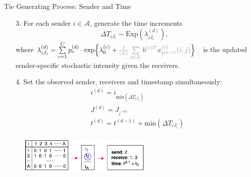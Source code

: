 \documentclass[10pt]{beamer}
\theoremstyle{definition}
\theoremstyle{remark}
\begin{document}
\begin{frame}{Tie Generating Process: Sender and Time}
\begin{itemize}
		\item [3.] For each sender $i \in \mathcal{A}$, generate the time increments 
		\footnotesize	\begin{equation*}
		\Delta T_{i{J_i}} \sim \mbox{Exp}(\lambda_{i{J_i}}^{(d)}),
		\end{equation*}\normalsize
		where \footnotesize$\lambda^{(d)}_{iJ_i}= \sum\limits_{c=1}^{C} p^{(d)}_c\cdot\mbox{exp}\Big\{\lambda^{(c)}_0+\textcolor{gray}{\frac{1}{|J_i|}\sum\limits_{j \in J_i} \boldsymbol{b}^{(c)T}\boldsymbol{x}^{(c)}_{t^{(d-1)}}(i, j)}\Big\}\quad$\normalsize is the updated sender-specific stochastic intensity given the receivers.\vspace{0.4cm}
		\item[4.] Set the observed sender, receivers and timestamp simultaneously:
		\footnotesize	\begin{equation*}
		\begin{aligned}
		&i^{(d)} = i_{\mbox{min}(\Delta T_{i{J_i}})} \\
		&J^{(d)} = J_{i^{(d)}}\\
		&t^{(d)} = t^{(d-1)}+\mbox{min}(\Delta T_{i{J_i}})\\
		\end{aligned}
		\end{equation*}
		\normalsize
\end{itemize}
 \begin{figure}
 	\includegraphics[width=0.57\textwidth]{figures/tie.pdf}
 \end{figure}	
\end{frame}
\end{document}
